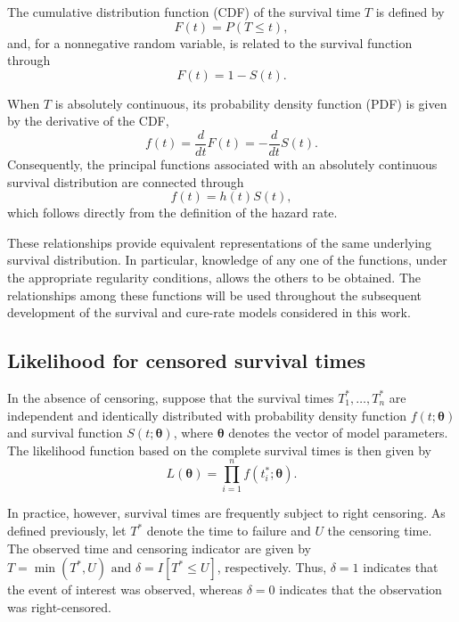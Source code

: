 The cumulative distribution function (CDF) of the survival time $T$ is defined by
\begin{equation}
\label{eq:cdf}
F(t) = P(T \leq t),
\end{equation}
and, for a nonnegative random variable, is related to the survival function through
\begin{equation}
\label{eq:cdf_survival}
F(t) = 1-S(t).
\end{equation}

When $T$ is absolutely continuous, its probability density function (PDF) is given by
the derivative of the CDF,
\begin{equation}
\label{eq:pdf}
f(t) = \frac{d}{dt}F(t)
     = -\frac{d}{dt}S(t).
\end{equation}
Consequently, the principal functions associated with an absolutely continuous survival
distribution are connected through
\[
f(t) = h(t)S(t),
\]
which follows directly from the definition of the hazard rate.

These relationships provide equivalent representations of the same underlying survival
distribution. In particular, knowledge of any one of the functions, under the appropriate
regularity conditions, allows the others to be obtained. The relationships among these
functions will be used throughout the subsequent development of the survival and cure-rate
models considered in this work.

\subsection{Likelihood for censored survival times}

In the absence of censoring, suppose that the survival times $T_1^*,\ldots,T_n^*$
are independent and identically distributed with probability density function
$f(t;\boldsymbol{\theta})$ and survival function $S(t;\boldsymbol{\theta})$, where
$\boldsymbol{\theta}$ denotes the vector of model parameters. The likelihood function
based on the complete survival times is then given by
\begin{equation}
\label{eq:complete_likelihood}
L(\boldsymbol{\theta})
=
\prod_{i=1}^{n} f(t_i^*;\boldsymbol{\theta}).
\end{equation}

In practice, however, survival times are frequently subject to right censoring. As defined
previously, let $T^*$ denote the time to failure and $U$ the censoring time. The observed
time and censoring indicator are given by $T=\min(T^*,U) \text{ and } \delta=I[T^*\leq U]$,
respectively. Thus, $\delta=1$ indicates that the event of interest was observed, whereas
$\delta=0$ indicates that the observation was right-censored.


